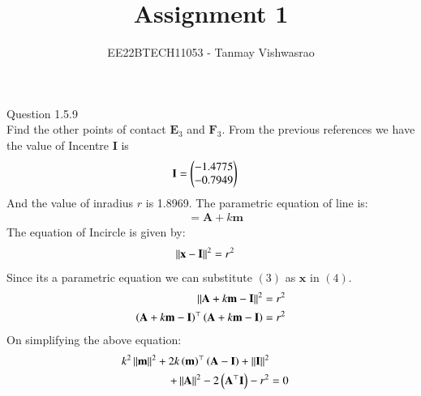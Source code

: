 \documentclass[journal,12pt,twocolumn]{IEEEtran}
\theoremstyle{remark}
\begin{document}
\let\vec\mathbf





\vspace{3cm}

\title{
Assignment 1
}
\author{ EE22BTECH11053 - Tanmay Vishwasrao%
	
}	

\maketitle

\newpage


\bigskip

\renewcommand{\thefigure}{\theenumi}
\renewcommand{\thetable}{\theenumi}
Question 1.5.9\\
Find the other points of contact $\vec{E}_3$ and $\vec{F}_3$.
\fi
\solution
From the previous references we have the value of Incentre $\vec{I}$ is
\begin{align}
\vec{I} &=\myvec{-1.4775\\-0.7949}
\end{align}
And the value of inradius $r$ is 1.8969. The parametric equation of line is:
\begin{align}
&= \vec{A}+k\vec{m}
\end{align}
The equation of Incircle is given by:
\begin{align}
\norm{\vec{x}-\vec{I}}^2 &= r^2
\end{align}
Since its a parametric equation we can substitute $(3)$ as $\vec{x}$ in $(4)$.
\begin{align}
\norm{\vec{A}+k\vec{m}-\vec{I}}^2 &= r^2 \\
\brak{\vec{A}+k\vec{m}-\vec{I}}^\top\brak{\vec{A}+k\vec{m}-\vec{I}} &= r^2
\end{align}
On simplifying the above equation:
\begin{align}
k^2\norm{\vec{m}}^2+2k\brak{\vec{m}}^\top\brak{\vec{A-I}}+\norm{\vec{I}}^2 \nonumber \\
+\norm{\vec{A}}^2-2\brak{\vec{A}^\top\vec{I}}-r^2 &= 0 \label{eq:6}
\end{align}
\end{document}
